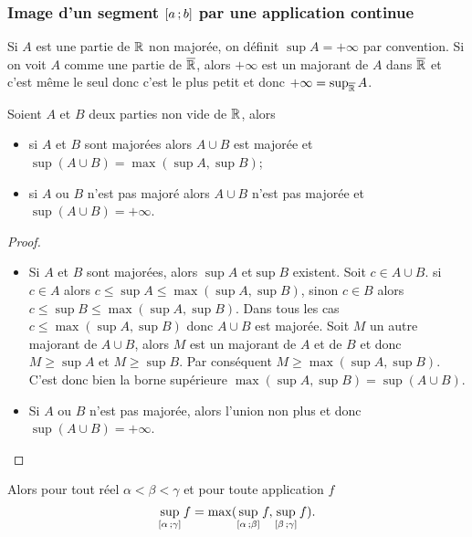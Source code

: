 \subsubsection[Image continue d'un segment]{Image d'un segment 
\(\left[ a \, ; {} b \right]\) par une application continue}

Si \(A\) est une partie de \(\mathbb{R}\) non majorée, on définit \(\sup A = + \infty\) 
par convention. Si on voit \(A\) comme une partie de \(\overline{\mathbb{R}}\), alors 
\(+\infty\) est un majorant de \(A\) dans \(\overline{\mathbb{R}}\) et c'est même le seul donc 
c'est le plus petit et donc \(+\infty=\sup_{\overline{\mathbb{R}}} A\).

\begin{lemme}
  Soient \(A\) et \(B\) deux parties non vide de \(\mathbb{R}\), alors
  \begin{itemize}
    \item si \(A\) et \(B\) sont majorées alors \(A \cup B\) est majorée et 
      \(\sup(A\cup B)=\max(\sup A, \sup B)\);
    \item si \(A\) ou \(B\) n'est pas majoré alors \(A \cup B\) n'est pas 
      majorée et \(\sup(A\cup B)=+\infty\).
  \end{itemize}
\end{lemme}
\begin{proof}
  \begin{itemize}
    \item Si \(A\) et \(B\) sont majorées, alors \(\sup A\) et\(\sup B\) 
      existent. Soit \(c \in A \cup B\). si \(c \in A\) alors \(c \leqslant \sup 
      A \leqslant \max(\sup A, \sup B)\), sinon \(c \in B\) alors \(c \leqslant 
      \sup B \leqslant \max(\sup A, \sup B)\). Dans tous les cas \(c \leqslant 
      \max(\sup A, \sup B)\) donc \(A \cup B\) est majorée. Soit \(M\) un autre 
      majorant de \(A \cup B\), alors \(M\) est un majorant de \(A\) et de \(B\) 
      et donc \(M \geqslant \sup A\) et \(M \geqslant \sup B\). Par conséquent 
      \(M \geqslant \max(\sup A, \sup B)\). C'est donc bien la borne supérieure 
      \(\max(\sup A, \sup B)=\sup(A \cup B)\).
    \item Si \(A\) ou \(B\) n'est pas majorée, alors l'union non plus et donc 
      \(\sup(A\cup B)=+\infty\).
  \end{itemize}
\end{proof}
Alors pour tout réel \(\alpha < \beta< \gamma\) et pour toute application \(f\)
\begin{equation}
  \sup\limits_{\left[ \alpha \, ; {} \gamma \right]}f = 
  \max(\sup\limits_{\left[ \alpha \, ; {} \beta \right]}f, 
  \sup\limits_{\left[ \beta \, ; {} \gamma \right]}f).
\end{equation}
